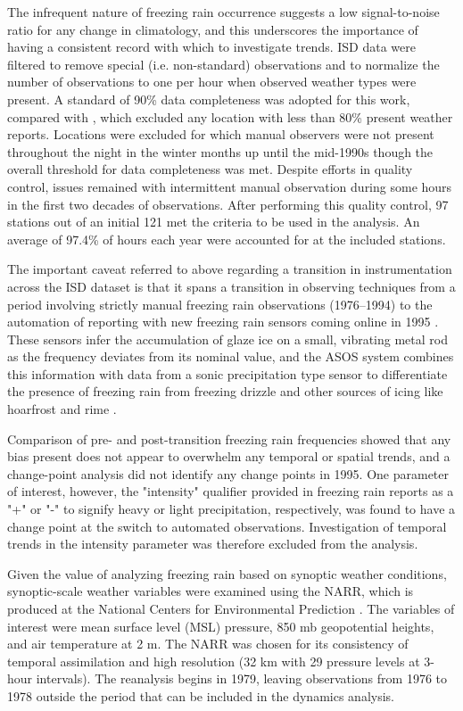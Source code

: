 \documentclass[twocol]{ametsoc}
\begin{document}
The infrequent nature of freezing rain occurrence suggests a low signal-to-noise ratio for any change in climatology, and this underscores the importance of having a consistent record with which to investigate trends. ISD data were filtered to remove special (i.e. non-standard) observations and to normalize the number of observations to one per hour when observed weather types were present. A standard of 90\% data completeness was adopted for this work, compared with \citet{cortinas2000climatology}, which excluded any location with less than 80\% present weather reports. Locations were excluded for which manual observers were not present throughout the night in the winter months up until the mid-1990s though the overall threshold for data completeness was met. Despite efforts in quality control, issues remained with intermittent manual observation during some hours in the first two decades of observations. After performing this quality control, 97 stations out of an initial 121 met the criteria to be used in the analysis. An average of 97.4\% of hours each year were accounted for at the included stations.

The important caveat referred to above regarding a transition in instrumentation across the ISD dataset is that it spans a transition in observing techniques from a period involving strictly manual freezing rain observations (1976--1994) to the automation of reporting with new freezing rain sensors coming online in 1995 \citep{ramsay1995status}. These sensors infer the accumulation of glaze ice on a small, vibrating metal rod as the frequency deviates from its nominal value, and the ASOS system combines this information with data from a sonic precipitation type sensor to differentiate the presence of freezing rain from freezing drizzle and other sources of icing like hoarfrost and rime \citep{asos1998}.

Comparison of pre- and post-transition freezing rain frequencies showed that any bias present does not appear to overwhelm any temporal or spatial trends, and a change-point analysis did not identify any change points in 1995. One parameter of interest, however, the "intensity" qualifier provided in freezing rain reports as a "+" or "-" to signify heavy or light precipitation, respectively, was found to have a change point at the switch to automated observations. Investigation of temporal trends in the intensity parameter was therefore excluded from the analysis.

Given the value of analyzing freezing rain based on synoptic weather conditions, synoptic-scale weather variables were examined using the NARR, which is produced at the National Centers for Environmental Prediction \citep{mesinger2006north}. The variables of interest were mean surface level (MSL) pressure, 850 mb geopotential heights, and air temperature at 2 m. The NARR was chosen for its consistency of temporal assimilation and high resolution (32 km with 29 pressure levels at 3-hour intervals). The reanalysis begins in 1979, leaving observations from 1976 to 1978 outside the period that can be included in the dynamics analysis.
\end{document}
